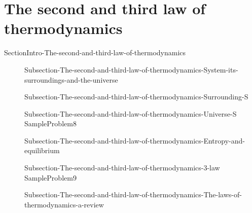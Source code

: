 \documentclass[main.tex]{subfiles}
\newcommand\chapterlabel{Ch-thermo}\setcounter{figurenewcounter}{0}\setcounter{tablenewcounter}{0}\setcounter{formulanewcounter}{0}\chapterpicture{../{\chapterlabel}/figure1}\chapterpicturelabel{PxFuel}
\begin{document}
\section{The second and third law of thermodynamics}{SectionIntro-The-second-and-third-law-of-thermodynamics}
\sloppy\begin{description}
\item[] {Subsection-The-second-and-third-law-of-thermodynamics-System-its-surroundings-and-the-universe}
\item[] {Subsection-The-second-and-third-law-of-thermodynamics-Surrounding-S}
\item[] {Subsection-The-second-and-third-law-of-thermodynamics-Universe-S}
{SampleProblem8}
 \item[] {Subsection-The-second-and-third-law-of-thermodynamics-Entropy-and-equilibrium}
\item[] {Subsection-The-second-and-third-law-of-thermodynamics-3-law}
{SampleProblem9}
 \item[] {Subsection-The-second-and-third-law-of-thermodynamics-The-laws-of-thermodynamics-a-review}
\end{description}
\end{document}
